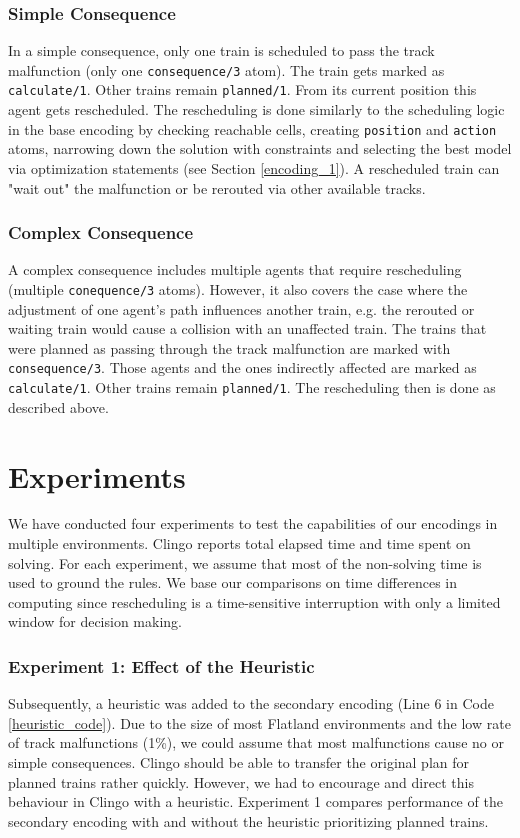 \documentclass[runningheads]{llncs}
\begin{document}
\subsubsection{Simple Consequence}\label{simple_consequence}
In a simple consequence, only one train is scheduled to pass the track malfunction (only one \verb|consequence/3| atom). The train gets marked as \verb|calculate/1|. Other trains remain \verb|planned/1|. From its current position this agent gets rescheduled. The rescheduling is done similarly to the scheduling logic in the base encoding by checking reachable cells, creating \verb|position| and \verb|action| atoms, narrowing down the solution with constraints and selecting the best model via optimization statements (see Section \ref{encoding_1}). A rescheduled train can "wait out" the malfunction or be rerouted via other available tracks.

\subsubsection{Complex Consequence}
A complex consequence includes multiple agents that require rescheduling (multiple \verb|conequence/3| atoms). However, it also covers the case where the adjustment of one agent's path influences another train, e.g. the rerouted or waiting train would cause a collision with an unaffected train. The trains that were planned as passing through the track malfunction are marked with \verb|consequence/3|. Those agents and the ones indirectly affected are marked as \verb|calculate/1|. Other trains remain \verb|planned/1|. The rescheduling then is done as described above.


\section{Experiments}
We have conducted four experiments to test the capabilities of our encodings in multiple environments. Clingo reports total elapsed time and time spent on solving. For each experiment, we assume that most of the non-solving time is used to ground the rules. We base our comparisons on time differences in computing since rescheduling is a  time-sensitive interruption with only a limited window for decision making.

\subsubsection{Experiment 1: Effect of the Heuristic}
Subsequently, a heuristic was added to the secondary encoding (Line 6 in Code \ref{heuristic_code}). Due to the size of most Flatland environments and the low rate of track malfunctions (1\%), we could assume that most malfunctions cause no or simple consequences. Clingo should be able to transfer the original plan for planned trains rather quickly. However, we had to encourage and direct this behaviour in Clingo with a heuristic. Experiment 1 compares performance of the secondary encoding with and without the heuristic prioritizing planned trains.
\end{document}
